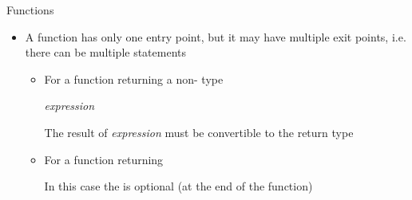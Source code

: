 \begin{frame}{Functions \insertcontinuationtext}

  \begin{itemize}

  \item<1-> A function has only one entry point, but it may have multiple exit
    points, i.e. there can be multiple  statements

    \begin{itemize}
    \item For a function returning a non- type

       \textit{expression}\code{;}

      The result of \textit{expression} must be convertible to the return type

    \item For a function returning 


      In this case the  is optional (at the end of the function)

    \end{itemize}

  \end{itemize}
\end{frame}

